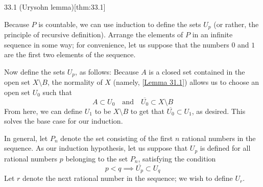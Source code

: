 \begin{thmBox}{33.1 (Urysohn lemma)}[thm:33.1]
\begin{proofBox}
        \baseSkip

        Because \( P \) is countable, we can use induction to define the sets 
        \( U_{ p } \) (or rather, the principle of recursive definition).
        Arrange the elements of \( P \) in an infinite sequence in some way; for 
        convenience, let us suppose that the numbers \( 0 \) and \( 1 \) are the
        first two elements of the sequence.

        \baseSkip

        Now define the sets \( U_{ p } \), as follows: Because \( A \) is a closed set
        contained in the open set \( X \setminus B \), the normality of \( X \) 
        (namely, [\hyperlink{lem:31.1}{Lemma 31.1}]) allows us to choose an open set 
        \( U_{ 0 } \) such that 
        \begin{equation*}
            A \subset U_{ 0 }
            \quad \mathrm{and} \quad 
            \overline{ U_{ 0 } } \subset X \setminus B
        \end{equation*}
        From here, we can define \( U_{ 1 } \) to be \( X \setminus B \) to get that
        \( \overline{ U_{ 0 } } \subset U_{ 1 } \), as desired.
        This solves the base case for our induction.

        \baseSkip

        In general, let \( P_{ n } \) denote the set consisting of the first \( n \)
        rational numbers in the sequence. 
        As our induction hypothesis, let us suppose that \( U_{ p } \) is defined for 
        all rational numbers \( p \) belonging to the set \( P_{ n } \), satisfying the
        condition
        \begin{equation*}
            p < q
            \implies 
            \overline{ U_{ p } } \subset U_{ q }
        \end{equation*}
        Let \( r \) denote the next rational number in the sequence; we wish to define
        \( U_{ r } \).

        \baseSkip


\end{proofBox}
\end{thmBox}
